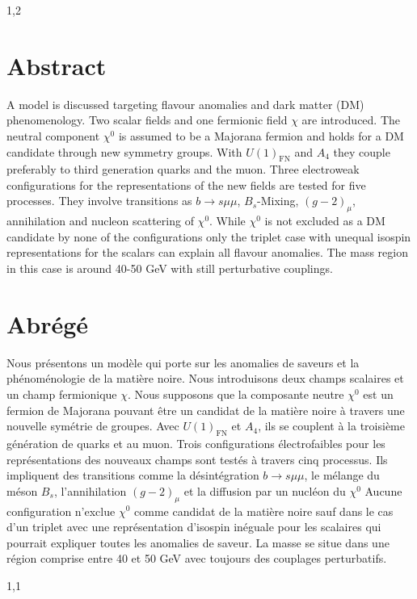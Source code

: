 \documentclass[11pt,a4paper,twoside]{article}
\numberwithin{equation}{section}
\newcommand{\FN}{U(1)_\text{FN}}
\begin{document}
\begin{spacing}{1,2}
 \section*{Abstract}
 A model is discussed targeting flavour anomalies and dark matter (DM) phenomenology. Two scalar fields and one fermionic field $\chi$ are introduced. 
 The neutral component $\chi^0$ is assumed to be a Majorana fermion and holds for a DM candidate through new symmetry groups. With $\FN$ and $A_4$
 they couple preferably to third generation quarks and the muon. Three electroweak configurations for the representations of the new fields are
 tested for five processes. They involve transitions as $b\rightarrow s\mu\mu$, $B_s$-Mixing,
 $(g-2)_\mu$, annihilation and nucleon scattering of $\chi^0$. While $\chi^0$ is not excluded as a DM candidate by none of the configurations only
 the triplet case with unequal isospin representations for the scalars can explain all flavour anomalies. The mass region in this case is around
 40-50 GeV with still perturbative couplings.

 \section*{Abrégé}
 Nous présentons un modèle qui porte sur les anomalies de saveurs et la phénoménologie de la matière noire. Nous introduisons deux champs scalaires 
 et un champ fermionique $\chi$.
Nous supposons que la composante neutre $\chi^0$ est un fermion de Majorana pouvant être un candidat de la matière noire à travers une nouvelle 
symétrie de groupes.
Avec $\FN$ et $A_4$, ils se couplent à la troisième génération de quarks et au muon. Trois configurations électrofaibles pour les représentations 
des nouveaux champs sont testés à travers cinq processus.
Ils impliquent des transitions comme la désintégration $b\rightarrow s\mu\mu$, le mélange du méson $B_s$, l'annihilation $(g-2)_\mu$ et la diffusion 
par un nucléon du $\chi^0$
Aucune configuration n'exclue $\chi^0$ comme candidat de la matière noire sauf dans le cas d'un triplet avec une représentation d'isospin inéguale 
pour les scalaires qui pourrait expliquer toutes les anomalies de saveur.
La masse se situe dans une région comprise entre 40 et 50 GeV avec toujours des couplages perturbatifs.

 \newpage


\end{spacing}
\begin{spacing}{1,1}
\tableofcontents\newpage

\end{spacing}
\end{document}
